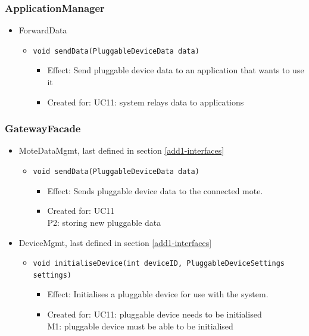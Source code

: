     \subsubsection{ApplicationManager}
        \begin{itemize}
            \item ForwardData
            \begin{itemize}
                \item \texttt{void sendData(PluggableDeviceData data)}
                \begin{itemize}
                    \item Effect: Send pluggable device data to an application that wants to use it
                    \item Created for: UC11: system relays data to applications \\
                \end{itemize}
            \end{itemize}
        \end{itemize}

    \subsubsection{GatewayFacade}
        \begin{itemize}
            \item MoteDataMgmt, last defined in section \ref{add1-interfaces}
            \begin{itemize}
                \item \texttt{void sendData(PluggableDeviceData data)}
                \begin{itemize}
                    \item Effect: Sends pluggable device data to the connected mote.
                    \item Created for: UC11 \\
                          P2: storing new pluggable data
                \end{itemize}
            \end{itemize}

            \item DeviceMgmt, last defined in section \ref{add1-interfaces}
            \begin{itemize}
                \item \texttt{void initialiseDevice(int deviceID, PluggableDeviceSettings settings)}
                \begin{itemize}
                    \item Effect: Initialises a pluggable device for use with the system.
                    \item Created for: UC11: pluggable device needs to be initialised \\
                          M1: pluggable device must be able to be initialised
                \end{itemize}
            \end{itemize}
        \end{itemize}

